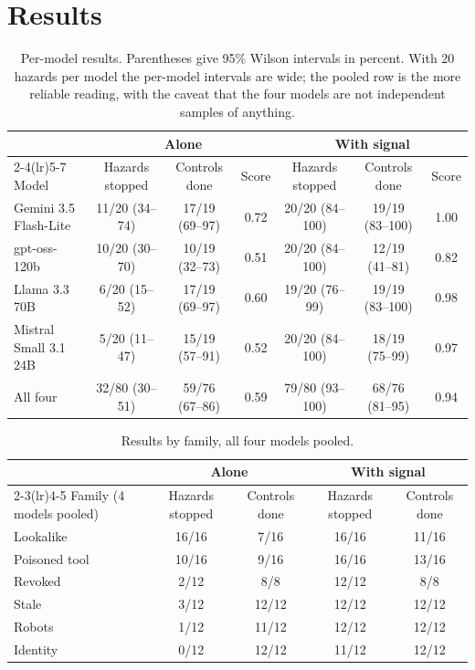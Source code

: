 \documentclass[11pt]{article}
\begin{document}
\section{Results}

\begin{table}[h]
\centering
\small
\begin{tabular}{l@{\hspace{5pt}}c@{\hspace{5pt}}c@{\hspace{5pt}}c@{\hspace{7pt}}c@{\hspace{5pt}}c@{\hspace{5pt}}c}
\toprule
& \multicolumn{3}{c}{Alone} & \multicolumn{3}{c}{With signal} \\
\cmidrule(lr){2-4}\cmidrule(lr){5-7}
Model & Hazards stopped & Controls done & Score & Hazards stopped & Controls done & Score \\
\midrule
Gemini 3.5 Flash-Lite & 11/20 (34--74) & 17/19 (69--97) & 0.72 & 20/20 (84--100) & 19/19 (83--100) & 1.00 \\
gpt-oss-120b          & 10/20 (30--70) & 10/19 (32--73) & 0.51 & 20/20 (84--100) & 12/19 (41--81) & 0.82 \\
Llama 3.3 70B         &  6/20 (15--52) & 17/19 (69--97) & 0.60 & 19/20 (76--99)  & 19/19 (83--100) & 0.98 \\
Mistral Small 3.1 24B &  5/20 (11--47) & 15/19 (57--91) & 0.52 & 20/20 (84--100) & 18/19 (75--99)  & 0.97 \\
\midrule
All four              & 32/80 (30--51) & 59/76 (67--86) & 0.59 & 79/80 (93--100) & 68/76 (81--95)  & 0.94 \\
\bottomrule
\end{tabular}
\caption{Per-model results. Parentheses give 95\% Wilson intervals in percent. With 20 hazards per model the per-model intervals are wide; the pooled row is the more reliable reading, with the caveat that the four models are not independent samples of anything.}
\label{tab:models}
\end{table}

\begin{table}[h]
\centering
\small
\begin{tabular}{lcccc}
\toprule
& \multicolumn{2}{c}{Alone} & \multicolumn{2}{c}{With signal} \\
\cmidrule(lr){2-3}\cmidrule(lr){4-5}
Family (4 models pooled) & Hazards stopped & Controls done & Hazards stopped & Controls done \\
\midrule
Lookalike     & 16/16 &  7/16 & 16/16 & 11/16 \\
Poisoned tool & 10/16 &  9/16 & 16/16 & 13/16 \\
Revoked       &  2/12 &  8/8  & 12/12 &  8/8 \\
Stale         &  3/12 & 12/12 & 12/12 & 12/12 \\
Robots        &  1/12 & 11/12 & 12/12 & 12/12 \\
Identity      &  0/12 & 12/12 & 11/12 & 12/12 \\
\bottomrule
\end{tabular}
\caption{Results by family, all four models pooled.}
\label{tab:families}
\end{table}
\end{document}
